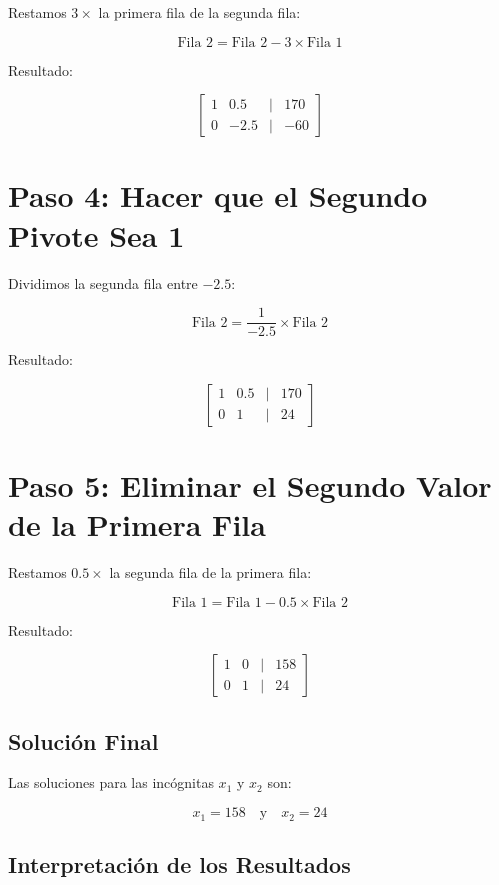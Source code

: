 \documentclass[a4paper,10pt]{article}
\begin{document}
Restamos \(3 \times\) la primera fila de la segunda fila:

\[
\text{Fila 2} = \text{Fila 2} - 3 \times \text{Fila 1}
\]

Resultado:

\[
\begin{bmatrix}
1 & 0.5 & | & 170 \\
0 & -2.5 & | & -60
\end{bmatrix}
\]

\section*{Paso 4: Hacer que el Segundo Pivote Sea 1}

Dividimos la segunda fila entre \(-2.5\):

\[
\text{Fila 2} = \frac{1}{-2.5} \times \text{Fila 2}
\]

Resultado:

\[
\begin{bmatrix}
1 & 0.5 & | & 170 \\
0 & 1 & | & 24
\end{bmatrix}
\]

\section*{Paso 5: Eliminar el Segundo Valor de la Primera Fila}

Restamos \(0.5 \times\) la segunda fila de la primera fila:

\[
\text{Fila 1} = \text{Fila 1} - 0.5 \times \text{Fila 2}
\]

Resultado:

\[
\begin{bmatrix}
1 & 0 & | & 158 \\
0 & 1 & | & 24
\end{bmatrix}
\]

\subsection{Solución Final}

Las soluciones para las incógnitas \(x_1\) y \(x_2\) son:

\[
x_1 = 158 \quad \text{y} \quad x_2 = 24
\]

\subsection{Interpretación de los Resultados}
\end{document}
